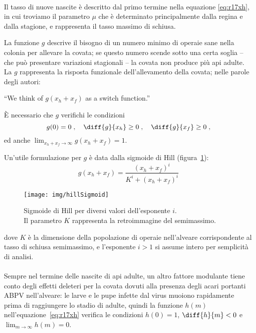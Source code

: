 \paragraph{}
Il tasso di nuove nascite è descritto dal primo termine nella equazione \eqref{eq:r17xh}, in cui troviamo il
parametro $\mu$ che è determinato principalmente dalla regina e dalla stagione, e rappresenta il tasso massimo
di schiusa.

La funzione $g$ descrive il bisogno di un numero minimo di operaie sane nella colonia per allevare la covata; se questo numero scende sotto una certa soglia -- che può presentare variazioni stagionali -- la covata non produce più api adulte.
La $g$ rappresenta la risposta funzionale dell'allevamento della covata; nelle parole degli autori:
\begin{displayquote}
``We think of $g(x_h + x_f)$ as a switch function.''
\end{displayquote}

È necessario che $g$ verifichi le condizioni
$$g(0)=0 \; , \quad %
\diff{g}{x_h} \geq 0 \; , \quad %
\diff{g}{x_f} \geq 0 \; ,$$
ed anche $\lim_{x_h+x_f \to \infty} g(x_h+x_f)=1$.

Un'utile formulazione per $g$ è data dalla sigmoide di Hill (figura~\ref{img:hillSigmoid}):
\begin{equation}
    g(x_h + x_f) = \frac{ (x_h+x_f)^i }{ K^i + (x_h+x_f)^i }
    \label{eq:hillSigmoid}
\end{equation}

\begin{figure}
    \centering
    \texttt{[image: img/hillSigmoid]}

    \caption[Sigmoidi di Hill.]{Sigmoide di Hill per diversi valori dell'esponente $i$.
        \\ Il parametro $K$ rappresenta la retroimmagine del semimassimo.}
    \label{img:hillSigmoid}
\end{figure}

dove $K$ è la dimensione della popolazione di operaie nell'alveare corrispondente al tasso di schiusa semimassimo, e l'esponente $i>1$ si assume intero per semplicità di analisi.

\paragraph{}
Sempre nel termine delle nascite di api adulte, un altro fattore modulante tiene conto degli effetti deleteri per la covata dovuti alla presenza degli acari portanti ABPV nell'alveare: le larve e le pupe infette dal virus muoiono rapidamente prima di raggiungere lo stadio di adulte, quindi la funzione $h(m)$ nell'equazione~\ref{eq:r17xh} verifica le condizioni $h(0)=1$, $\diff{h}{m} <0$ e $\lim_{m \to \infty} h(m) = 0$.

